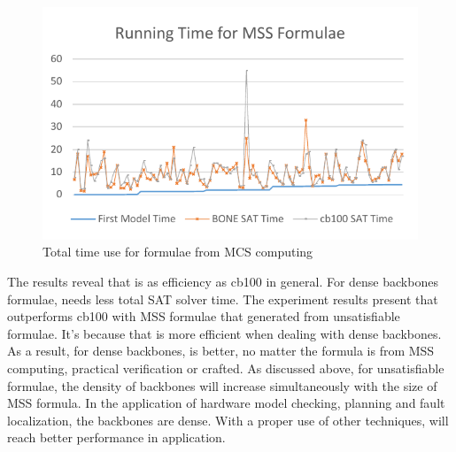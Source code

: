 \begin{figure}
    \centering
    \includegraphics[scale=0.7]{mcs.pdf}
   \caption{Total time use for formulae from MCS computing}
   \label{fig:mcs-time}
\end{figure}



The results reveal that \tool is as efficiency as cb100 in general. For dense backbones formulae, \tool needs less total SAT solver time. The experiment results present that \tool outperforms cb100 with MSS formulae that generated from unsatisfiable formulae. It's because that \tool is more efficient when dealing with dense backbones. As a result, for dense backbones, \tool is better, no matter the formula is from MSS computing, practical verification or crafted.
As discussed above, for unsatisfiable formulae, the density of backbones will increase simultaneously with the size of MSS formula. In the application of hardware model checking, planning and fault localization, the backbones are dense. With a proper use of other techniques, \tool will reach better performance in application.




